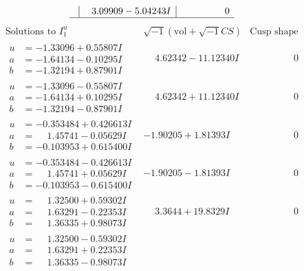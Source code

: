 \documentclass[1p]{elsarticle_modified}
\theoremstyle{definition}
\newcommand{\I}{\sqrt{-1}}
\begin{document}
$$\begin{array}{c|c|c}
 & \phantom{-}3.09909 - 5.04243 I & \phantom{-0.000000 } 0\\
 \hline 
 \end{array}$$\newpage$$\begin{array}{c|c|c}  
\text{Solutions to }I^u_{1}& \I (\text{vol} + \sqrt{-1}CS) & \text{Cusp shape}\\
 \hline 
\begin{aligned}
u &= -1.33096 + 0.55807 I \\
a &= -1.64134 - 0.10295 I \\
b &= -1.32194 + 0.87901 I\end{aligned}
 & \phantom{-}4.62342 - 11.12340 I & \phantom{-0.000000 } 0 \\ \hline\begin{aligned}
u &= -1.33096 - 0.55807 I \\
a &= -1.64134 + 0.10295 I \\
b &= -1.32194 - 0.87901 I\end{aligned}
 & \phantom{-}4.62342 + 11.12340 I & \phantom{-0.000000 } 0 \\ \hline\begin{aligned}
u &= -0.353484 + 0.426613 I \\
a &= \phantom{-}1.45741 - 0.05629 I \\
b &= -0.103953 + 0.615400 I\end{aligned}
 & -1.90205 + 1.81393 I & \phantom{-0.000000 } 0 \\ \hline\begin{aligned}
u &= -0.353484 - 0.426613 I \\
a &= \phantom{-}1.45741 + 0.05629 I \\
b &= -0.103953 - 0.615400 I\end{aligned}
 & -1.90205 - 1.81393 I & \phantom{-0.000000 } 0 \\ \hline\begin{aligned}
u &= \phantom{-}1.32500 + 0.59302 I \\
a &= \phantom{-}1.63291 - 0.22353 I \\
b &= \phantom{-}1.36335 + 0.98073 I\end{aligned}
 & \phantom{-}3.3644 + 19.8329 I & \phantom{-0.000000 } 0 \\ \hline\begin{aligned}
u &= \phantom{-}1.32500 - 0.59302 I \\
a &= \phantom{-}1.63291 + 0.22353 I \\
b &= \phantom{-}1.36335 - 0.98073 I\end{aligned}

\end{array}$$
\end{document}
